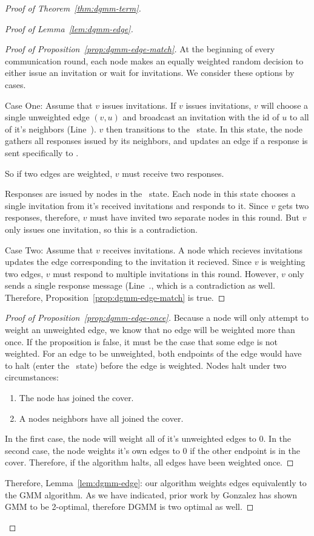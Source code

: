 \begin{proof}[Proof of Theorem~\ref{thm:dgmm-term}]
\begin{proof}[Proof of Lemma~\ref{lem:dgmm-edge}]
\begin{proof}[Proof of Proposition~\ref{prop:dgmm-edge-match}]
At the beginning of every communication round, each node makes an equally weighted random decision to either issue an invitation or wait for invitations. We consider these options by cases.

    Case One: Assume that $v$ issues invitations. If $v$ issues invitations, $v$ will choose a single unweighted edge $(v,u)$ and broadcast an invitation with the id of $u$ to all of it's neighbors (Line~). $v$ then transitions to the \cWd\ state. In this state, the node gathers all responses issued by its neighbors, and updates an edge if a response is sent specifically to .

    So if two edges are weighted, $v$ must receive two responses.

    Responses are issued by nodes in the \cRd\ state. Each node in this state chooses a single invitation from it's received invitations and responds to it. Since $v$ gets two responses, therefore, $v$ must have invited two separate nodes in this round. But $v$ only issues one invitation, so this is a contradiction.

    Case Two: Assume that $v$ receives invitations. A node which recieves invitations updates the edge corresponding to the invitation it recieved. Since $v$ is weighting two edges, $v$ must respond to multiple invitations in this round. However, $v$ only sends a single response message (Line~., which is a contradiction as well.
    Therefore, Proposition~\ref{prop:dgmm-edge-match} is true.
  \end{proof}
  \begin{proof}[Proof of Proposition~\ref{prop:dgmm-edge-once}]
    Because a node will only attempt to weight an unweighted edge, we know that no edge will be weighted more than once. If the proposition is false, it must be the case that some edge is not weighted.
    For an edge to be unweighted, both endpoints of the edge would have to halt (enter the \cDd\ state) before the edge is weighted. Nodes halt under two circumstances:
    \begin{enumerate}
    \item The node has joined the cover.
    \item A nodes neighbors have all joined the cover.
    \end{enumerate}
    In the first case, the node will weight all of it's unweighted edges to 0. In the second case, the node weights it's own edges to 0 if the other endpoint is in the cover.
    Therefore, if the algorithm halts, all edges have been weighted once.
  \end{proof}
  Therefore, Lemma~\ref{lem:dgmm-edge}: our algorithm weights edges equivalently to the GMM algorithm. As we have indicated, prior work by Gonzalez has shown GMM to be 2-optimal, therefore DGMM is two optimal as well.
\end{proof}


\end{proof}
